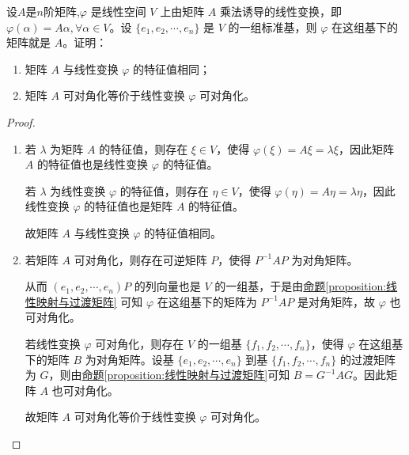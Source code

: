 \documentclass[../../main.tex]{subfiles}%
\begin{document}
\begin{lemma}\label{lemma:线性变换与矩阵的可对角化等价,特征值相同}
设$A$是$n$阶矩阵,$\varphi$ 是线性空间 $V$ 上由矩阵 $A$ 乘法诱导的线性变换，即 $\varphi(\alpha) = A\alpha, \forall \alpha \in V$。设 $\{e_1, e_2, \cdots, e_n\}$ 是 $V$ 的一组标准基，则 $\varphi$ 在这组基下的矩阵就是 $A$。证明：
\begin{enumerate}[(1)]
\item 矩阵 $A$ 与线性变换 $\varphi$ 的特征值相同；

\item 矩阵 $A$ 可对角化等价于线性变换 $\varphi$ 可对角化。
\end{enumerate}
\end{lemma}
\begin{proof}
\begin{enumerate}[(1)]
\item 若 $\lambda$ 为矩阵 $A$ 的特征值，则存在 $\xi \in V$，使得 $\varphi(\xi) = A\xi = \lambda \xi$，因此矩阵 $A$ 的特征值也是线性变换 $\varphi$ 的特征值。

若 $\lambda$ 为线性变换 $\varphi$ 的特征值，则存在 $\eta \in V$，使得 $\varphi(\eta) = A\eta = \lambda \eta$，因此线性变换 $\varphi$ 的特征值也是矩阵 $A$ 的特征值。

故矩阵 $A$ 与线性变换 $\varphi$ 的特征值相同。

\item 若矩阵 $A$ 可对角化，则存在可逆矩阵 $P$，使得 $P^{-1}AP$ 为对角矩阵。

从而 $(e_1, e_2, \cdots, e_n)P$ 的列向量也是 $V$ 的一组基，于是由\hyperref[proposition:线性映射与过渡矩阵]{命题\ref{proposition:线性映射与过渡矩阵}} 可知 $\varphi$ 在这组基下的矩阵为 $P^{-1}AP$ 是对角矩阵，故 $\varphi$ 也可对角化。

若线性变换 $\varphi$ 可对角化，则存在 $V$ 的一组基 $\{f_1, f_2, \cdots, f_n\}$，使得 $\varphi$ 在这组基下的矩阵 $B$ 为对角矩阵。设基 $\{e_1, e_2, \cdots, e_n\}$ 到基 $\{f_1, f_2, \cdots, f_n\}$ 的过渡矩阵为 $G$，则由\hyperref[proposition:线性映射与过渡矩阵]{命题\ref{proposition:线性映射与过渡矩阵}}可知 $B = G^{-1}AG$。因此矩阵 $A$ 也可对角化。

故矩阵 $A$ 可对角化等价于线性变换 $\varphi$ 可对角化。
\end{enumerate}
\end{proof}
\end{document}
